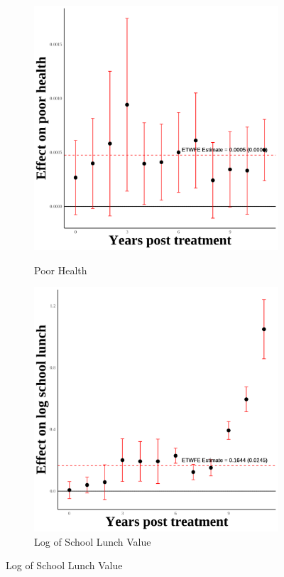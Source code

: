\documentclass[12pt,english]{article}
\begin{document}
\begin{figure}[H]
  \begin{subfigure}[b]{0.3\textwidth}
    \centering
    \caption{Poor Health}
    \includegraphics[width=\linewidth]{figures/plot01-poor_health_event_study.png}
    \label{fig:poor-health}
  \end{subfigure}
  \hfill
  \begin{subfigure}[b]{0.3\textwidth}
    \centering
    \caption{Log of School Lunch Value}
    \includegraphics[width=\linewidth]{figures/plot02-ln_schl_lunch_event_study.png}

\end{subfigure}
\end{figure}
\end{document}
